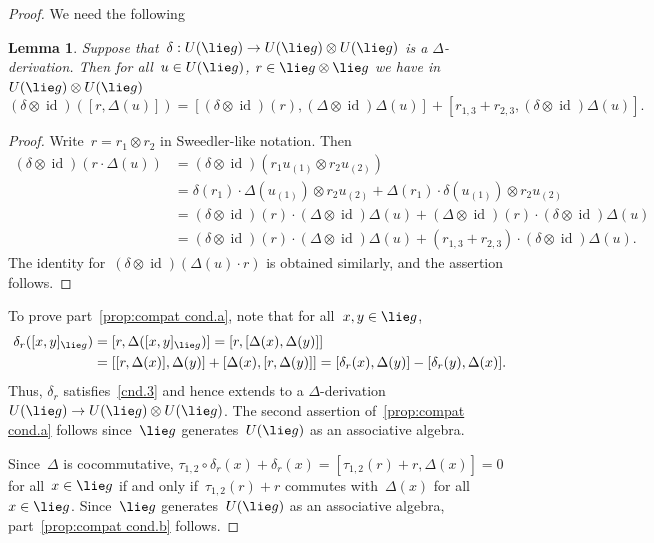\documentclass[12pt, reqno]{amsart}
\newtheorem{lemma}[theorem]{Lemma}
\theoremstyle{definition}
\numberwithin{equation}{section}
\newcommand{\tensor}{\otimes}
\DeclareMathOperator{\id}{id}
\begin{document}
\begin{proof}
We need the following 
\begin{lemma}\label{lem:prop Delta-der}
    Suppose that~$\delta:U(\lie g)\to U(\lie g)\tensor U(\lie g)$ is a $\Delta$-derivation.
    Then for all~$u\in U(\lie g)$, $r\in\lie g\tensor\lie g$ we have in $U(\lie g)\tensor U(\lie g)$
    \begin{equation}\label{eq:cobrack commutator}(\delta\tensor\id)([r,\Delta(u)])=[(\delta\tensor\id)(r),(\Delta\tensor\id)\Delta(u)]+
    [r_{1,3}+r_{2,3},(\delta\tensor\id)\Delta(u)].
    \end{equation} 
\end{lemma}
\begin{proof}
Write~$r=r_1\tensor r_2$ in Sweedler-like notation. Then
\begin{align*}
(\delta\tensor\id)(r\cdot \Delta(u))&=(\delta\tensor\id)
(r_1 u_{(1)}\tensor r_2 u_{(2)})\\
&=\delta(r_1)\cdot \Delta(u_{(1)})\tensor r_2 u_{(2)}+\Delta(r_1)\cdot \delta(u_{(1)})\tensor r_2u_{(2)}\\
&=(\delta\tensor\id)(r)\cdot (\Delta\tensor\id)\Delta(u)+
(\Delta\tensor\id)(r)\cdot 
(\delta\tensor\id)\Delta(u)\\
&=(\delta\tensor\id)(r)\cdot (\Delta\tensor\id)\Delta(u)+
(r_{1,3}+r_{2,3})\cdot (\delta\tensor\id)\Delta(u).
\end{align*}
The identity for~$(\delta\tensor\id)(\Delta(u)\cdot r)$ is obtained similarly, and the assertion follows.
\end{proof}

To prove part~\ref{prop:compat cond.a}, note that for all~$x,y\in\lie g$,
\begin{align*}
\delta_{r}([x,y]_{\lie g})&=
[r,\Delta([x,y]_{\lie g})]=
[r,[\Delta(x),\Delta(y)]]
\\
&=
[[r,\Delta(x)],\Delta(y)]+[
\Delta(x),[r,\Delta(y)]]
=[\delta_{r}(x),\Delta(y)]-[\delta_{r}(y),\Delta(x)].
\end{align*}
Thus, $\delta_{r}$ satisfies~\ref{cnd.3} and hence extends to a $\Delta$-derivation $U(\lie g)\to U(\lie g)\tensor U(\lie g)$. The second assertion of~\ref{prop:compat cond.a} follows since~$\lie g$
generates~$U(\lie g)$ as an associative algebra.

Since~$\Delta$ is cocommutative,
$\tau_{1,2}\circ\delta_{r}(x)+\delta_{r}(x)=[\tau_{1,2}(r)+r,\Delta(x)]=0$ for all~$x\in\lie g$
if and only if~$\tau_{1,2}(r)+r$ commutes with~$\Delta(x)$ for all~$x\in\lie g$. Since~$\lie g$ generates~$U(\lie g)$ as an associative algebra, part~\ref{prop:compat cond.b} follows.


\end{proof}
\end{document}
